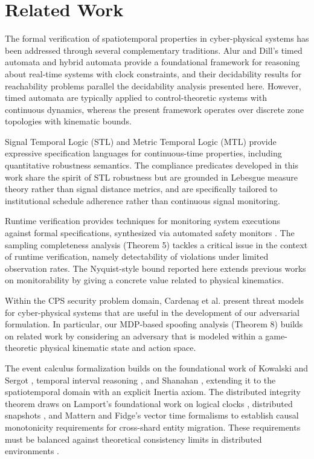 \documentclass[conference]{IEEEtran}
\begin{document}
\section{Related Work}

The formal verification of spatiotemporal properties in cyber-physical systems has been addressed through several complementary traditions. Alur and Dill's timed automata \cite{b26} and hybrid automata \cite{b14} provide a foundational framework for reasoning about real-time systems with clock constraints, and their decidability results for reachability problems parallel the decidability analysis presented here. However, timed automata are typically applied to control-theoretic systems with continuous dynamics, whereas the present framework operates over discrete zone topologies with kinematic bounds.

Signal Temporal Logic (STL) and Metric Temporal Logic (MTL) \cite{b27} provide expressive specification languages for continuous-time properties, including quantitative robustness semantics. The compliance predicates developed in this work share the spirit of STL robustness but are grounded in Lebesgue measure theory rather than signal distance metrics, and are specifically tailored to institutional schedule adherence rather than continuous signal monitoring.

Runtime verification \cite{b28} provides techniques for monitoring system executions against formal specifications, synthesized via automated safety monitors \cite{b29}. The sampling completeness analysis (Theorem 5) tackles a critical issue in the context of runtime verification, namely detectability of violations under limited observation rates. The Nyquist-style bound reported here extends previous works on monitorability \cite{b27} by giving a concrete value related to physical kinematics.

Within the CPS security problem domain, Cardenaş et al. \cite{b18} present threat models for cyber-physical systems that are useful in the development of our adversarial formulation. In particular, our MDP-based spoofing analysis (Theorem 8) builds on related work by considering an adversary that is modeled within a game-theoretic physical kinematic state and action space.

The event calculus formalization builds on the foundational work of Kowalski and Sergot \cite{b2}, temporal interval reasoning \cite{b6}, and Shanahan \cite{b19}, extending it to the spatiotemporal domain with an explicit Inertia axiom. The distributed integrity theorem draws on Lamport's foundational work on logical clocks \cite{b8}, distributed snapshots \cite{b3}, and Mattern and Fidge's vector time formalisms \cite{b13, b25} to establish causal monotonicity requirements for cross-shard entity migration. These requirements must be balanced against theoretical consistency limits in distributed environments \cite{b9}.
\end{document}
